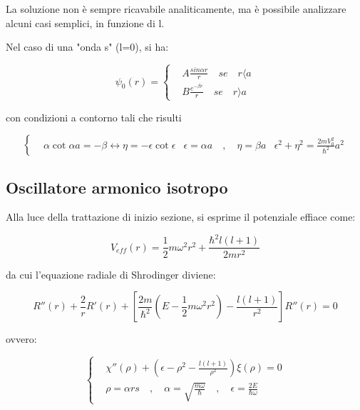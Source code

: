 \documentclass{report}
\begin{document}
La soluzione non è sempre ricavabile analiticamente, ma è possibile analizzare alcuni casi semplici, in funzione di l.

Nel caso di una "onda s" (l=0), si ha:

\begin{equation}
  \psi_0(r)=
  \left\{
  \begin{aligned}
     & A\frac{sin{\alpha r}}{r} \quad se \quad r\langle a \\
     & B\frac{e^{-\beta r}}{r} \quad se \quad r\rangle a
  \end{aligned}
  \right.
\end{equation}

con condizioni a contorno tali che risulti

\begin{equation}
  \left\{
  \begin{aligned}
     & \alpha \cot{\alpha a}=-\beta \leftrightarrow \eta=-\epsilon \cot{\epsilon}
     & \epsilon=\alpha a \quad , \quad \eta=\beta a
     & \epsilon^2+\eta^2=\frac{2mV_0^2}{\hbar^2}a^2
  \end{aligned}
  \right.
\end{equation}

\subsection{Oscillatore armonico isotropo}
Alla luce della trattazione di inizio sezione, si esprime il potenziale effiace come:

\begin{equation}
  V_{eff}(r)=\frac{1}{2}m\omega^2r^2+\frac{\hbar^2l(l+1)}{2mr^2}
\end{equation}

da cui l'equazione radiale di Shrodinger diviene:

\begin{equation}
  R''(r)+\frac{2}{r}R'(r)+\left[\frac{2m}{\hbar^2}\left(E-\frac{1}{2}m\omega^2r^2\right)-\frac{l(l+1)}{r^2}\right]R''(r)=0
\end{equation}

ovvero:

\begin{equation}
  \left\{
  \begin{aligned}
     & \chi''(\rho)+\left(\epsilon -\rho^2-\frac{l(l+1)}{\rho^2}\right)\xi(\rho)=0                                     \\
     & \rho=\alpha rs \quad , \quad \alpha=\sqrt{\frac{m\omega}{\hbar}} \quad , \quad \epsilon=\frac{2E}{\hbar \omega}
  \end{aligned}
  \right.
\end{equation}
\end{document}
